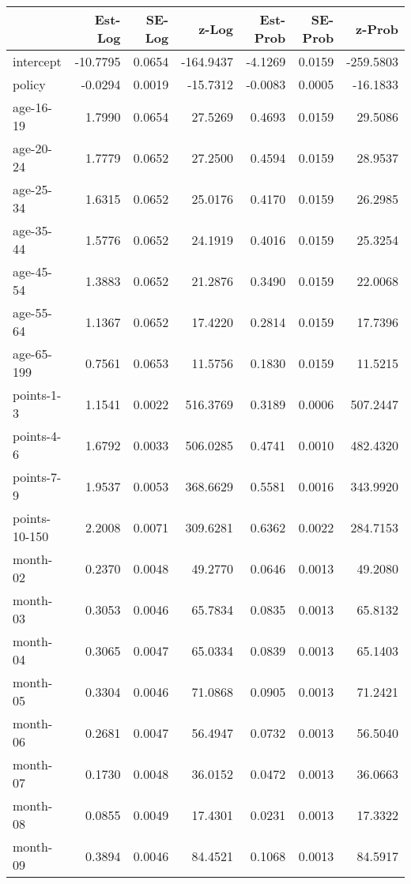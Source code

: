 \documentclass[10pt]{article}
\begin{document}
\begin{table}[ht]
\centering
\begin{tabular}{lrrrrrr}
  \hline
 & Est-Log & SE-Log & z-Log & Est-Prob & SE-Prob & z-Prob \\ 
  \hline
intercept & -10.7795 & 0.0654 & -164.9437 & -4.1269 & 0.0159 & -259.5803 \\ 
  policy & -0.0294 & 0.0019 & -15.7312 & -0.0083 & 0.0005 & -16.1833 \\ 
  age-16-19 & 1.7990 & 0.0654 & 27.5269 & 0.4693 & 0.0159 & 29.5086 \\ 
  age-20-24 & 1.7779 & 0.0652 & 27.2500 & 0.4594 & 0.0159 & 28.9537 \\ 
  age-25-34 & 1.6315 & 0.0652 & 25.0176 & 0.4170 & 0.0159 & 26.2985 \\ 
  age-35-44 & 1.5776 & 0.0652 & 24.1919 & 0.4016 & 0.0159 & 25.3254 \\ 
  age-45-54 & 1.3883 & 0.0652 & 21.2876 & 0.3490 & 0.0159 & 22.0068 \\ 
  age-55-64 & 1.1367 & 0.0652 & 17.4220 & 0.2814 & 0.0159 & 17.7396 \\ 
  age-65-199 & 0.7561 & 0.0653 & 11.5756 & 0.1830 & 0.0159 & 11.5215 \\ 
  points-1-3 & 1.1541 & 0.0022 & 516.3769 & 0.3189 & 0.0006 & 507.2447 \\ 
  points-4-6 & 1.6792 & 0.0033 & 506.0285 & 0.4741 & 0.0010 & 482.4320 \\ 
  points-7-9 & 1.9537 & 0.0053 & 368.6629 & 0.5581 & 0.0016 & 343.9920 \\ 
  points-10-150 & 2.2008 & 0.0071 & 309.6281 & 0.6362 & 0.0022 & 284.7153 \\ 
  month-02 & 0.2370 & 0.0048 & 49.2770 & 0.0646 & 0.0013 & 49.2080 \\ 
  month-03 & 0.3053 & 0.0046 & 65.7834 & 0.0835 & 0.0013 & 65.8132 \\ 
  month-04 & 0.3065 & 0.0047 & 65.0334 & 0.0839 & 0.0013 & 65.1403 \\ 
  month-05 & 0.3304 & 0.0046 & 71.0868 & 0.0905 & 0.0013 & 71.2421 \\ 
  month-06 & 0.2681 & 0.0047 & 56.4947 & 0.0732 & 0.0013 & 56.5040 \\ 
  month-07 & 0.1730 & 0.0048 & 36.0152 & 0.0472 & 0.0013 & 36.0663 \\ 
  month-08 & 0.0855 & 0.0049 & 17.4301 & 0.0231 & 0.0013 & 17.3322 \\ 
  month-09 & 0.3894 & 0.0046 & 84.4521 & 0.1068 & 0.0013 & 84.5917 \\ 

\end{tabular}
\end{table}
\end{document}
